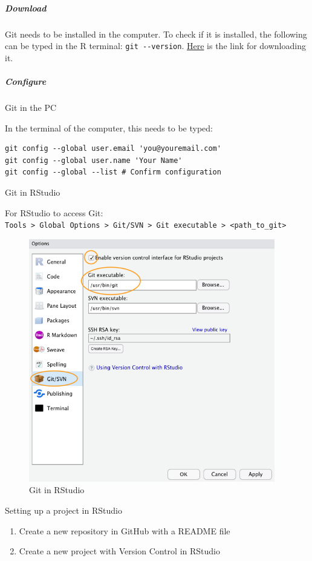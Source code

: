 \documentclass[
]{article}
\providecommand{\tightlist}{%
  \setlength{\itemsep}{0pt}\setlength{\parskip}{0pt}}
\begin{document}
\hypertarget{download}{%
\subparagraph{Download}\label{download}}

Git needs to be installed in the computer. To check if it is installed,
the following can be typed in the R terminal: \texttt{git\ -\/-version}.
\href{https://git-scm.com/downloads}{Here} is the link for downloading
it.

\hypertarget{configure}{%
\subparagraph{Configure}\label{configure}}

Git in the PC

In the terminal of the computer, this needs to be typed:

\begin{verbatim}
git config --global user.email 'you@youremail.com'
git config --global user.name 'Your Name'
git config --global --list # Confirm configuration
\end{verbatim}

Git in RStudio

For RStudio to access Git:
\texttt{Tools\ \textgreater{}\ Global\ Options\ \textgreater{}\ Git/SVN\ \textgreater{}\ Git\ executable\ \textgreater{}\ \textless{}path\_to\_git\textgreater{}}

\begin{figure}
\centering
\includegraphics[width=\textwidth,height=4.16667in]{Figures/Git_in_RStudio.png}
\caption{Git in RStudio}
\end{figure}

Setting up a project in RStudio

\begin{enumerate}
\def\labelenumi{\arabic{enumi}.}
\tightlist
\item
  Create a new repository in GitHub with a README file
\item
  Create a new project with Version Control in RStudio
\end{enumerate}
\end{document}
